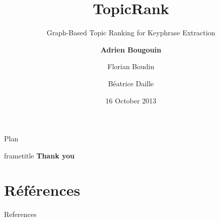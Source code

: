 \documentclass[14pt, xcolor={usenames, dvipsnames}]{beamer}
\title{TopicRank}
\subtitle{Graph-Based Topic Ranking for Keyphrase Extraction}
\author{\textbf{Adrien Bougouin} \and Florian Boudin \and Béatrice Daille}
\institute{\normalsize{Université de Nantes, LINA, France}}
\date{16 October 2013}
\begin{document}
  \renewcommand*{\theenumii}{\alph{enumii}}
  \renewcommand*{\theenumiii}{\roman{enumiii}}

  \begin{frame}
    \titlepage
  \end{frame}
  \setcounter{framenumber}{0}

  
  
  
  \begin{frame}{Plan}
    \tableofcontents
  \end{frame}
  
  
  
  \begin{frame}
    \vfill
    \begin{beamercolorbox}[center,shadow=true,rounded=true]{frametitle} 
      \Huge{\textbf{Thank you}}
    \end{beamercolorbox} 
    \vfill
  \end{frame}
  
  \section*{Références}
    \begin{frame}[allowframebreaks]{References}
      \def\newblock{\hskip .11em plus .33em minus .07em}
      
      
    \end{frame}
\end{document}

